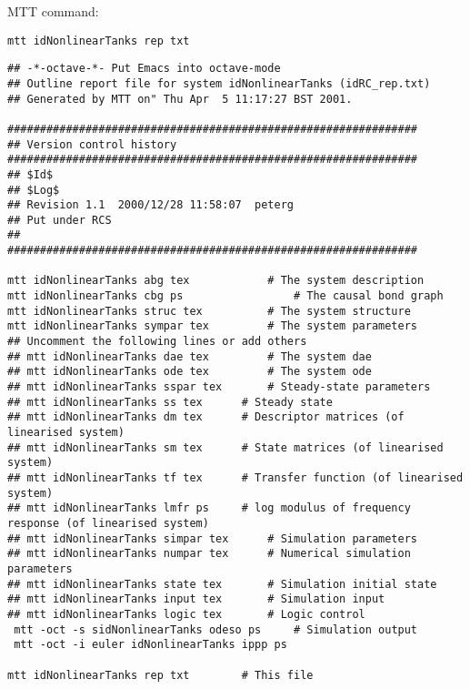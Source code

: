 MTT command:
\begin{verbatim}
mtt idNonlinearTanks rep txt 
\end{verbatim}
  \begin{verbatim}
## -*-octave-*- Put Emacs into octave-mode
## Outline report file for system idNonlinearTanks (idRC_rep.txt)
## Generated by MTT on" Thu Apr  5 11:17:27 BST 2001.

###############################################################
## Version control history
###############################################################
## $Id$
## $Log$
## Revision 1.1  2000/12/28 11:58:07  peterg
## Put under RCS
##
###############################################################

mtt idNonlinearTanks abg tex			# The system description
mtt idNonlinearTanks cbg ps 		        # The causal bond graph
mtt idNonlinearTanks struc tex	        # The system structure
mtt idNonlinearTanks sympar tex	        # The system parameters
## Uncomment the following lines or add others
## mtt idNonlinearTanks dae tex	        # The system dae
## mtt idNonlinearTanks ode tex	        # The system ode 
## mtt idNonlinearTanks sspar tex		# Steady-state parameters
## mtt idNonlinearTanks ss tex 		# Steady state
## mtt idNonlinearTanks dm tex		# Descriptor matrices (of linearised system)
## mtt idNonlinearTanks sm tex		# State matrices (of linearised system)
## mtt idNonlinearTanks tf tex		# Transfer function (of linearised system)
## mtt idNonlinearTanks lmfr ps		# log modulus of frequency response (of linearised system)
## mtt idNonlinearTanks simpar tex		# Simulation parameters
## mtt idNonlinearTanks numpar tex		# Numerical simulation parameters
## mtt idNonlinearTanks state tex		# Simulation initial state
## mtt idNonlinearTanks input tex		# Simulation input
## mtt idNonlinearTanks logic tex		# Logic control
 mtt -oct -s sidNonlinearTanks odeso ps		# Simulation output
 mtt -oct -i euler idNonlinearTanks ippp ps

mtt idNonlinearTanks rep txt		# This file
  \end{verbatim}
